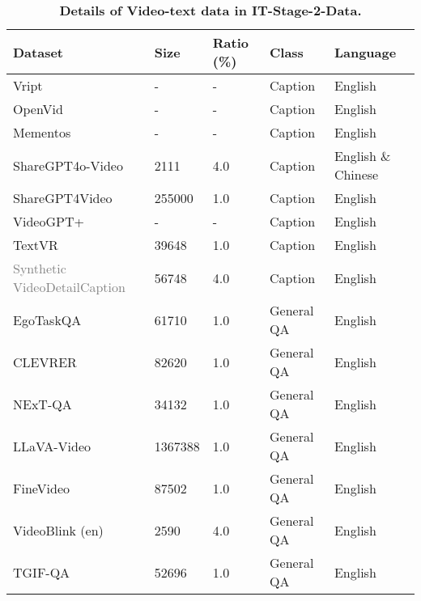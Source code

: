 \begin{table}[h]
\centering
\caption{\textbf{Details of Video-text data in IT-Stage-2-Data.}}
\label{tab:video_text_stage2}
\setlength{\tabcolsep}{7pt}
\begin{tabular}{l|l|l|l|l}
\hline
Dataset & Size & Ratio (\%) & Class & Language \\
\hline
Vript~\cite{yang2024vript} & - & - & Caption & English \\
OpenVid~\cite{nan2024openvid} & - & - & Caption & English \\
Mementos~\cite{wang2024mementos} & - & - & Caption & English \\
ShareGPT4o-Video~\cite{chen2024far} & 2111 & 4.0 & Caption & English \& Chinese \\
ShareGPT4Video~\cite{chen2024sharegpt4video} & 255000 & 1.0 & Caption & English \\
VideoGPT+~\cite{Maaz2024VideoGPT+} & - & - & Caption & English \\
TextVR~\cite{wu2023largecrossmodal} & 39648 & 1.0 & Caption & English \\
\textcolor{gray}{Synthetic VideoDetailCaption} & 56748 & 4.0 & Caption & English \\
EgoTaskQA~\cite{jia2022egotaskqa} & 61710 & 1.0 & General QA & English \\
CLEVRER~\cite{yi2019clevrer} & 82620 & 1.0 & General QA & English \\
NExT-QA~\cite{xiao2021next} & 34132 & 1.0 & General QA & English \\
LLaVA-Video~\cite{zhang2024video} & 1367388 & 1.0 & General QA & English \\
FineVideo~\cite{FineVideo} & 87502 & 1.0 & General QA & English \\
VideoBlink (en)~\cite{videoblink} & 2590 & 4.0 & General QA & English \\
TGIF-QA~\cite{yuntgifqa} & 52696 & 1.0 & General QA & English \\
\hline
\end{tabular}
\end{table}


